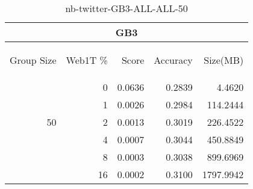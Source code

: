 \begin{center}
\begin{table}[htbp] 
 \begin{center}
\begin{tabular}{ | r | r | r | r | r |}
\hline
\multicolumn{5}{|c|}{GB3}\\
\hline
\begin{sideways}Group Size\end{sideways} & \begin{sideways}Web1T \%\end{sideways} & \begin{sideways}Score\end{sideways} & \begin{sideways}Accuracy\end{sideways} & \begin{sideways}Size(MB)\end{sideways}\\
\hline
\multirow{5}{*}{50}
 & 0 & 0.0636 & 0.2839 & 4.4620\\ \cline{2-5}
 & 1 & 0.0026 & 0.2984 & 114.2444\\ \cline{2-5}
 & 2 & 0.0013 & 0.3019 & 226.4522\\ \cline{2-5}
 & 4 & 0.0007 & 0.3044 & 450.8849\\ \cline{2-5}
 & 8 & 0.0003 & 0.3038 & 899.6969\\ \cline{2-5}
 & 16 & 0.0002 & 0.3100 & 1797.9942\\ \cline{2-5}
\hline
\end{tabular}
\caption{nb-twitter-GB3-ALL-ALL-50}
\label{table:nb-twitter-GB3-ALL-ALL-50}
\end{center}
 \end{table}
\end{center}

